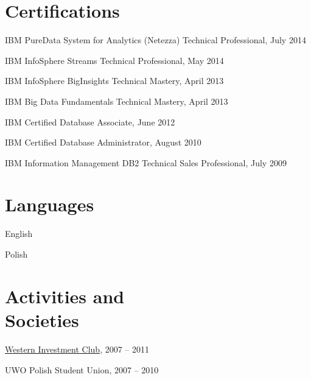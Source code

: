 \documentclass[margin,line]{resume}
\begin{document}
\begin{resume}
\section{\mysidestyle Certifications}

\begin{list2}
	\item IBM PureData System for Analytics (Netezza) Technical Professional, July 2014
	\item IBM InfoSphere Streams Technical Professional, May 2014
	\item IBM InfoSphere BigInsights Technical Mastery, April 2013
	\item IBM Big Data Fundamentals Technical Mastery, April 2013
	\item IBM Certified Database Associate, June 2012
	\item IBM Certified Database Administrator, August 2010
	\item IBM Information Management DB2 Technical Sales Professional, July 2009
\end{list2}

\section{\mysidestyle Languages}

\begin{list2}
	\item English
	\item Polish
\end{list2}


\newpage



\section{\mysidestyle Activities and\\Societies}

\begin{list2}
	\item \href{http://www.westerninvestmentclub.ca/}{Western Investment Club}, 2007 -- 2011
	\item UWO Polish Student Union, 2007 -- 2010
\end{list2}


\end{resume}
\end{document}
